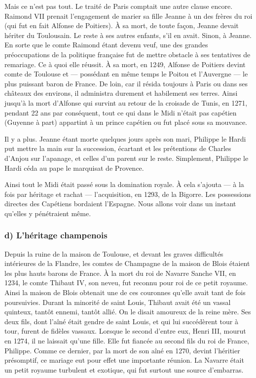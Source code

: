 \documentclass[french,twoside]{book} %
\begin{document}
Mais ce n’est pas tout. Le traité de Paris comptait une autre clause encore. Raimond VII prenait l’engagement de marier sa fille Jeanne à un des frères du roi (qui fut en fait Alfonse de Poitiers). À sa mort, de toute façon, Jeanne devait hériter du Toulousain. Le reste à ses autres enfants, s’il en avait. Sinon, à Jeanne. En sorte que le comte Raimond étant devenu veuf, une des grandes préoccupations de la politique française fut de mettre obstacle à ses tentatives de remariage. Ce à quoi elle réussit. À sa mort, en 1249, Alfonse de Poitiers devint comte de Toulouse et — possédant en même temps le Poitou et l’Auvergne — le plus puissant baron de France. De loin, car il résida toujours à Paris ou dans ses châteaux des environs, il administra durement et habilement ses terres. Ainsi jusqu’à la mort d’Alfonse qui survint au retour de la croisade de Tunis, en 1271, pendant 22 ans par conséquent, tout ce qui dans le Midi n’était pas capétien (Guyenne à part) appartint à un prince capétien ou fut placé sous sa mouvance.\par
Il y a plus. Jeanne étant morte quelques jours après son mari, Philippe le Hardi put mettre la main sur la succession, écartant et les prétentions de Charles d’Anjou sur l’apanage, et celles d’un parent sur le reste. Simplement, Philippe le Hardi céda au pape le marquisat de Provence.\par
Ainsi tout le Midi était passé sous la domination royale. À cela s’ajouta — à la fois par héritage et rachat — l’acquisition, en 1293, de la Bigorre. Les possessions directes des Capétiens bordaient l’Espagne. Nous allons voir dans un instant qu’elles y pénétraient même.
\subsubsection[{d) L’héritage champenois}]{d) L’héritage champenois}
\noindent Depuis la ruine de la maison de Toulouse, et devant les graves difficultés intérieures de la Flandre, les comtes de Champagne de la maison de Blois étaient les plus hauts barons de France. À la mort du roi de Navarre Sanche VII, en 1234, le comte Thibaut IV, son neveu, fut reconnu pour roi de ce petit royaume. Ainsi la maison de Blois obtenait une de ces couronnes qu’elle avait tant de fois poursuivies. Durant la minorité de saint Louis, Thibaut avait été un vassal quinteux, tantôt ennemi, tantôt allié. On le disait amoureux de la reine mère. Ses deux fils, dont l’aîné était gendre de saint Louis, et qui lui succédèrent tour à tour, furent de fidèles vassaux. Lorsque le second d’entre eux, Henri III, mourut en 1274, il ne laissait qu’une fille. Elle fut fiancée au second fils du roi de France, Philippe. Comme ce dernier, par la mort de son aîné en 1270, devint l’héritier présomptif, ce mariage eut pour effet une importante réunion. La Navarre était un petit royaume turbulent et exotique, qui fut surtout une source d’embarras.\par
\end{document}
